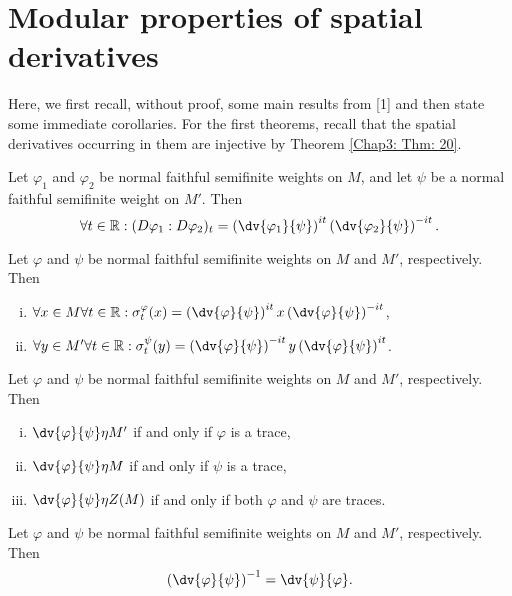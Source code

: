 \section{Modular properties of spatial derivatives}
Here, we first recall, without proof, some main results from [1] and then state some immediate corollaries. For the first theorems, recall that the spatial derivatives occurring in them are injective by Theorem \ref{Chap3: Thm: 20}.
\begin{theorem}
    Let $\varphi_1$ and $\varphi_2$ be normal faithful semifinite weights on $M$, and let $\psi$ be a normal faithful semifinite weight on $M'$. Then
    \[
        \forall t\in \mathbb{R}:(D\varphi_1:D\varphi_2)_t=\left( \dv{\varphi_1}{\psi}\right)^{it}\left( \dv{\varphi_2}{\psi}\right)^{-it}.
    \]
\end{theorem}
\begin{theorem}\label{Chap3: Thm: 26}
    Let $\varphi$ and $\psi$ be normal faithful semifinite weights on $M$ and $M'$, respectively. Then
    \begin{enumerate}[(i)]
        \item $\forall x\in M\forall t\in \mathbb{R}:\sigma_t^\varphi(x)=\left( \dv{\varphi}{\psi}\right)^{it}x\left( \dv{\varphi}{\psi}\right)^{-it}$,
        \item $\forall y\in M'\forall t\in \mathbb{R}:\sigma_t^\psi(y)=\left( \dv{\varphi}{\psi}\right)^{-it}y\left( \dv{\varphi}{\psi}\right)^{it}$.
    \end{enumerate}
\end{theorem}
\begin{corollary}\label{Chap3: Coro: 27}
    Let $\varphi$ and $\psi$ be normal faithful semifinite weights on $M$ and $M'$, respectively. Then
    \begin{enumerate}[(i)]
        \item $\dv{\varphi}{\psi}\eta M'$ if and only if $\varphi$ is a trace,
        \item $\dv{\varphi}{\psi}\eta M$ if and only if $\psi$ is a trace,
        \item $\dv{\varphi}{\psi}\eta Z(M)$ if and only if both $\varphi$ and $\psi$ are traces.
    \end{enumerate}
\end{corollary}
\begin{theorem}
    Let $\varphi$ and $\psi$ be normal faithful semifinite weights on $M$ and $M'$, respectively. Then
    \[
        \left( \dv{\varphi}{\psi} \right)^{-1}=\dv{\psi}{\varphi}.
    \]
\end{theorem}
